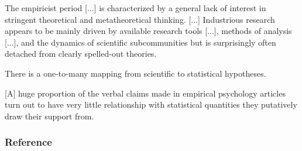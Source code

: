 \documentclass[aspectratio=169]{beamer}
\begin{document}
\begin{frame}
    \hspace*{\fill}
    \raisebox{50.5pt}{
        \begin{minipage}[t]{1em}
            \fontsize{56}{66}\selectfont
            \bfseries
            ,,
        \end{minipage}
    }
    \begin{minipage}{24em}
        The empiricist period [...] is characterized by a general
        lack of interest in stringent theoretical and metatheoretical thinking.
        [...]  Industrious research appears to be mainly driven by available
        research tools [...], methods of analysis [...], and the dynamics
        of scientific subcommunities but is surprisingly often detached from
        clearly spelled-out theories.

        \bigskip
        \scriptsize
        \raggedleft
        \citep[str. 123]{fiedlerToolsToysTruisms2004}
    \end{minipage}
    \hspace*{\fill}
\end{frame}

\begin{frame}
    \hspace*{\fill}
    \raisebox{74.5pt}{
        \begin{minipage}[t]{1em}
            \fontsize{56}{66}\selectfont
            \bfseries
            ,,
        \end{minipage}
    }
    \begin{minipage}{24em}
        There is a one-to-many mapping from scientific to statistical
        hypotheses.

        \begin{flushright}
            \bigskip
            \scriptsize
            \citep[str. 6]{gelmanGardenForkingPaths2013}
        \end{flushright}

        \bigskip

        [A] huge proportion of the verbal claims made in empirical psychology
        articles turn out to have very little relationship with statistical
        quantities they putatively draw their support from.

        \begin{flushright}
            \bigskip
            \scriptsize
            \raggedleft
            \citep[str. 2]{yarkoniGeneralizabilityCrisis2019}
        \end{flushright}
    \end{minipage}
    \hspace*{\fill}
\end{frame}


\begin{frame}[allowframebreaks]
    \frametitle{Reference}

    
    
\end{frame}
\end{document}

